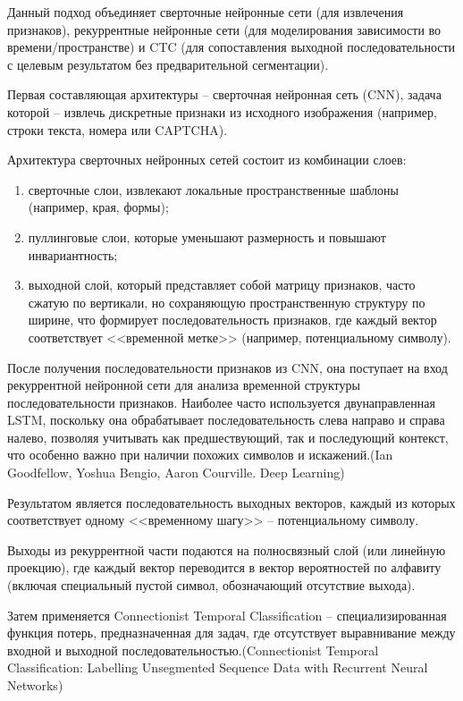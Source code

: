 Данный подход объединяет сверточные нейронные сети (для извлечения признаков), 
рекуррентные нейронные сети (для моделирования зависимости во 
времени/пространстве) и CTC (для сопоставления выходной последовательности с 
целевым результатом без предварительной сегментации).

Первая составляющая архитектуры -- сверточная нейронная сеть (CNN), задача 
которой -- извлечь дискретные признаки из исходного изображения (например, строки 
текста, номера или CAPTCHA).

Архитектура сверточных нейронных сетей состоит из комбинации слоев:

\begin{enumerate}
    \item сверточные слои, извлекают локальные пространственные шаблоны 
    (например, края, формы);
    \item пуллинговые слои, которые уменьшают размерность и повышают 
    инвариантность;
    \item выходной слой, который представляет собой матрицу признаков, часто 
    сжатую по вертикали, но сохраняющую пространственную структуру по ширине, 
    что формирует последовательность признаков, где каждый вектор соответствует 
    <<временной метке>> (например, потенциальному символу).
\end{enumerate}

После получения последовательности признаков из CNN, она поступает на вход 
рекуррентной нейронной сети для анализа временной структуры последовательности 
признаков. Наиболее часто используется двунаправленная LSTM, поскольку она 
обрабатывает последовательность слева направо и справа налево, позволяя учитывать 
как предшествующий, так и последующий контекст, что особенно важно при наличии 
похожих символов и искажений.(Ian Goodfellow, Yoshua Bengio, Aaron Courville. Deep Learning)

Результатом является последовательность выходных векторов, каждый из которых 
соответствует одному <<временному шагу>> -- потенциальному символу.

Выходы из рекуррентной части подаются на полносвязный слой (или линейную 
проекцию), где каждый вектор переводится в вектор вероятностей по алфавиту 
(включая специальный пустой символ, обозначающий отсутствие выхода).

Затем применяется Connectionist Temporal Classification -- специализированная 
функция потерь, предназначенная для задач, где отсутствует выравнивание между 
входной и выходной последовательностью.(Connectionist Temporal Classification: Labelling Unsegmented
Sequence Data with Recurrent Neural Networks)

